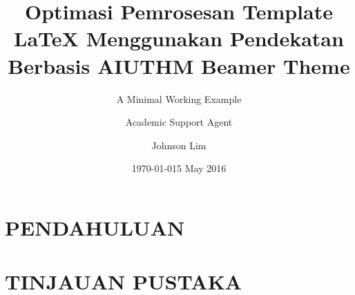 \documentclass{beamer}
\title{Optimasi Pemrosesan Template LaTeX Menggunakan Pendekatan Berbasis AI}
\author{Academic Support Agent}
\date{\today}
\begin{document}
\maketitle

\begin{abstract}

\end{abstract}

\chapter{PENDAHULUAN}


\chapter{TINJAUAN PUSTAKA}





\usepackage[english]{babel}
\usepackage[scaled=.90]{helvet}
\usepackage{courier}

\title{UTHM Beamer Theme}
\subtitle{A Minimal Working Example} 

\author{Johnson Lim}

\date{5 May 2016}


\end{document}

